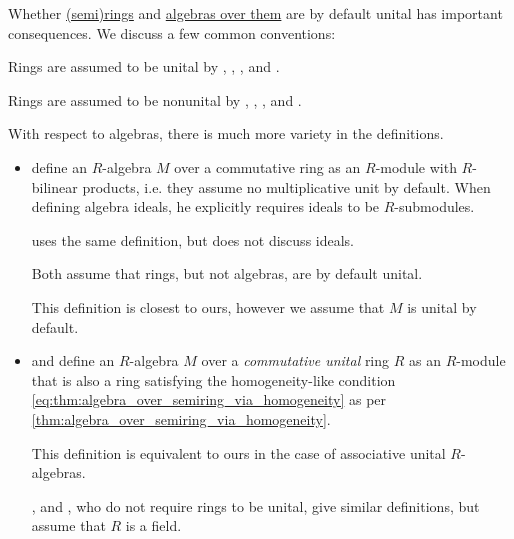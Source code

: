 \begin{remark}\label{rem:ring_unitality}
  Whether \hyperref[def:semiring]{(semi)rings} and \hyperref[def:algebra_over_semiring]{algebras over them} are by default unital has important consequences. We discuss a few common conventions:
  \begin{thmenum}
     Rings are assumed to be unital by
    \cite[def. 1.8.1]{Bourbaki1998Algebra1to3},
    \cite[def. 2.1]{Jacobson1985BasicAlgebraI},
    \cite[83]{Lang2002Algebra},
    \cite[11]{Eisenbud1995CommutativeAlgebra} and
    \cite[def. III.1.1]{Aluffi2009Algebra}.

     Rings are assumed to be nonunital by
    \cite[def. 1.3.1]{Винберг2014КурсАлгебры},
    \cite[152]{Кострикин2020АлгебраЧасть1},
    \cite[271]{Курош1968КурсВысшейАлгебры},
    \cite[112]{Тыртышников2017ОсновыАлгебры} and
    \cite[def. V.1]{ГеновМиховскиМоллов1991Алгебра}.

     With respect to algebras, there is much more variety in the definitions.
    \begin{itemize}
      \item \Textcite[def. 3.1.1]{Bourbaki1998Algebra1to3} define an \( R \)-algebra \( M \) over a commutative ring as an \( R \)-module with \( R \)-bilinear products, i.e. they assume no multiplicative unit by default. When defining algebra ideals, he explicitly requires ideals to be \( R \)-submodules.

      \Textcite[121]{Lang2002Algebra} uses the same definition, but does not discuss ideals.

      Both assume that rings, but not algebras, are by default unital.

      This definition is closest to ours, however we assume that \( M \) is unital by default.

      \item \Textcite[543]{Rotman2015AdvancedModernAlgebraPart1} and \textcite[4]{КоцевСидеров2016КомутативнаАлгебра} define an \( R \)-algebra \( M \) over a \emph{commutative unital} ring \( R \) as an \( R \)-module that is also a ring satisfying the homogeneity-like condition \eqref{eq:thm:algebra_over_semiring_via_homogeneity} as per \cref{thm:algebra_over_semiring_via_homogeneity}.

      This definition is equivalent to ours in the case of associative unital \( R \)-algebras.

      \Textcite[def. 1.7.1]{Винберг2014КурсАлгебры}, \textcite[66]{Кострикин2020АлгебраЧасть2} and \textcite[def. XI.2]{ГеновМиховскиМоллов1991Алгебра}, who do not require rings to be unital, give similar definitions, but assume that \( R \) is a field.


\end{itemize}
\end{thmenum}
\end{remark}
